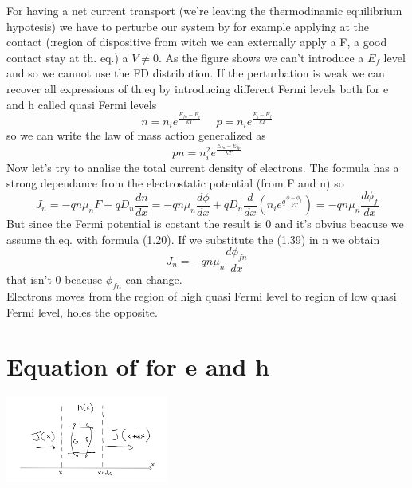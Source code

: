 For having a net current transport (we're leaving the thermodinamic equilibrium hypotesis) we have to perturbe our system by for example applying at the contact (:region of dispositive from witch we can externally apply a F, a good contact stay at th. eq.) a $V\neq 0$. 
As the figure shows  we can't introduce a $E_f$ level and so we cannot use the FD distribution. If the perturbation is weak we can recover all expressions of th.eq by introducing different Fermi levels both for e and h called quasi Fermi levels
\begin{equation}
n=n_ie^{\frac{E_{fn}-E_i}{kT}} \ \ \ \ \ \ p=n_ie^{\frac{E_i-E_f}{kT}}
\end{equation}
so we can write the law of mass action generalized as 
\begin{equation}
pn=n_i^2e^{\frac{E_{fn}-E_{fp}}{kT}}
\end{equation}
Now let's try to analise the total current density of electrons. The formula has a strong dependance from the electrostatic potential (from F and n) so
\begin{equation}
J_n=-qn\mu_nF+qD_n\frac{dn}{dx}=-qn\mu_n\frac{d\phi}{dx}+qD_n\frac{d}{dx}\left(n_ie^{q\frac{\phi-\phi_f}{kT}}\right)=-qn\mu_n\frac{d\phi_f}{dx}
\end{equation} 
But since the Fermi potential is costant the result is 0 and it's obvius beacuse we assume th.eq. with formula (1.20).
If we substitute the (1.39) in n we obtain
\begin{equation}
J_n=-qn\mu_n\frac{d\phi_{fn}}{dx}
\end{equation}
that isn't 0 beacuse $\phi_{fn}$ can change.\\
Electrons moves from the region of high quasi Fermi level to region of low quasi Fermi level, holes the opposite.
\newline
\section{Equation of for e and h}

\centering
\includegraphics[width=0.4\textwidth]{continuityeq.png}\\
\raggedright

